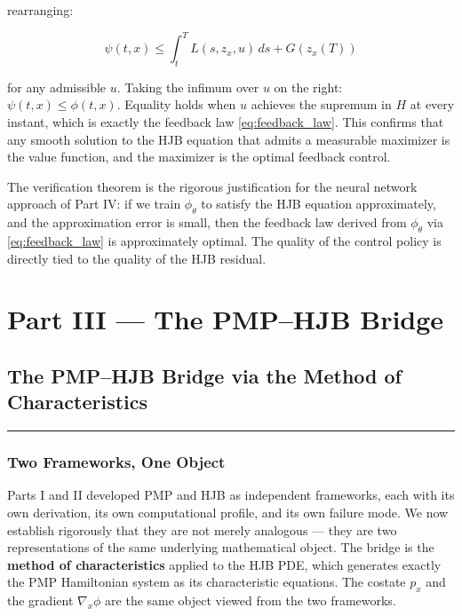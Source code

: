\documentclass{article}
\begin{document}
\begin{mathrequirementsbox}
rearranging:

\begin{equation}
    \psi(t,x) \leq \int_t^T L(s, z_x, u)\, ds + G(z_x(T))
\end{equation}

for any admissible $u$. Taking the infimum over $u$ on the right: $\psi(t,x)
\leq \phi(t,x)$. Equality holds when $u$ achieves the supremum in $H$ at every
instant, which is exactly the feedback law \eqref{eq:feedback_law}. This
confirms that any smooth solution to the HJB equation that admits a measurable
maximizer is the value function, and the maximizer is the optimal feedback
control.

The verification theorem is the rigorous justification for the neural network
approach of Part IV: if we train $\phi_\theta$ to satisfy the HJB equation
approximately, and the approximation error is small, then the feedback law
derived from $\phi_\theta$ via \eqref{eq:feedback_law} is approximately optimal.
The quality of the control policy is directly tied to the quality of the HJB
residual.
\end{mathrequirementsbox}


\pagebreak

\section{Part III --- The PMP--HJB Bridge}

\subsection{The PMP--HJB Bridge via the Method of Characteristics}
\label{sec:bridge}

\medskip\hrule\medskip

\subsubsection{Two Frameworks, One Object}

Parts I and II developed PMP and HJB as independent frameworks, each with its
own derivation, its own computational profile, and its own failure mode. We now
establish rigorously that they are not merely analogous --- they are two
representations of the same underlying mathematical object. The bridge is the
\textbf{method of characteristics} applied to the HJB PDE, which generates
exactly the PMP Hamiltonian system as its characteristic equations. The costate
$p_x$ and the gradient $\nabla_x \phi$ are the same object viewed from the two
frameworks.
\end{document}
